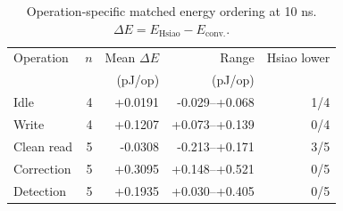 \begin{table}[t]
\caption{Operation-specific matched energy ordering at 10 ns. $\Delta E=E_{\mathrm{Hsiao}}-E_{\mathrm{conv.}}$.}
\label{tab:headline}
\centering\footnotesize
\setlength{\tabcolsep}{3.1pt}
\begin{tabular}{lrrrr}
\toprule
Operation & $n$ & Mean $\Delta E$ & Range & Hsiao lower \\
 & & (pJ/op) & (pJ/op) & \\
\midrule
Idle & 4 & +0.0191 & -0.029--+0.068 & 1/4 \\
Write & 4 & +0.1207 & +0.073--+0.139 & 0/4 \\
Clean read & 5 & -0.0308 & -0.213--+0.171 & 3/5 \\
Correction & 5 & +0.3095 & +0.148--+0.521 & 0/5 \\
Detection & 5 & +0.1935 & +0.030--+0.405 & 0/5 \\
\bottomrule
\end{tabular}
\end{table}

